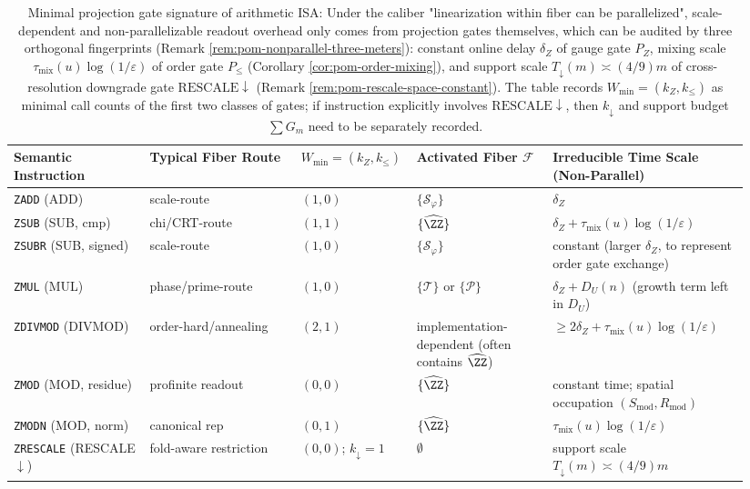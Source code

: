 \begin{table}[H]
\centering
\scriptsize
\setlength{\tabcolsep}{6pt}
\caption{Minimal projection gate signature of arithmetic ISA: Under the caliber "linearization within fiber can be parallelized", scale-dependent and non-parallelizable readout overhead only comes from projection gates themselves, which can be audited by three orthogonal fingerprints (Remark \ref{rem:pom-nonparallel-three-meters}): constant online delay \(\delta_Z\) of gauge gate \(P_Z\), mixing scale \(\tau_{\mathrm{mix}}(u)\log(1/\varepsilon)\) of order gate \(P_{\le}\) (Corollary \ref{cor:pom-order-mixing}), and support scale \(T_{\downarrow}(m)\asymp (4/9)m\) of cross-resolution downgrade gate \(\mathrm{RESCALE}\downarrow\) (Remark \ref{rem:pom-rescale-space-constant}). The table records \(W_{\min}=(k_Z,k_{\le})\) as minimal call counts of the first two classes of gates; if instruction explicitly involves \(\mathrm{RESCALE}\downarrow\), then \(k_{\downarrow}\) and support budget \(\sum G_m\) need to be separately recorded.}
\label{tab:pom-isa-minsig}
\begin{tabular}{p{0.18\linewidth} p{0.20\linewidth} p{0.12\linewidth} p{0.18\linewidth} p{0.26\linewidth}}
\toprule
Semantic Instruction & Typical Fiber Route & $W_{\min}=(k_Z,k_{\le})$ & Activated Fiber $\mathcal{F}$ & Irreducible Time Scale (Non-Parallel)\\
\midrule
\texttt{ZADD} (ADD) & scale-route & $(1,0)$ & $\{\mathcal{S}_\varphi\}$ & $\delta_Z$\\
\texttt{ZSUB} (SUB, cmp) & chi/CRT-route & $(1,1)$ & $\{\widehat{\ZZ}\}$ & $\delta_Z+\tau_{\mathrm{mix}}(u)\log(1/\varepsilon)$\\
\texttt{ZSUBR} (SUB, signed) & scale-route & $(1,0)$ & $\{\mathcal{S}_\varphi\}$ & constant (larger $\delta_Z$, to represent order gate exchange)\\
\texttt{ZMUL} (MUL) & phase/prime-route & $(1,0)$ & $\{\mathcal{T}\}$ or $\{\mathcal{P}\}$ & $\delta_Z + D_U(n)$ (growth term left in $D_U$)\\
\texttt{ZDIVMOD} (DIVMOD) & order-hard/annealing & $(2,1)$ & implementation-dependent (often contains $\widehat{\ZZ}$) & $\ge 2\delta_Z+\tau_{\mathrm{mix}}(u)\log(1/\varepsilon)$\\
\texttt{ZMOD} (MOD, residue) & profinite readout & $(0,0)$ & $\{\widehat{\ZZ}\}$ & constant time; spatial occupation $(S_{\mathrm{mod}},R_{\mathrm{mod}})$\\
\texttt{ZMODN} (MOD, norm) & canonical rep & $(0,1)$ & $\{\widehat{\ZZ}\}$ & $\tau_{\mathrm{mix}}(u)\log(1/\varepsilon)$\\
\texttt{ZRESCALE} (RESCALE$\downarrow$) & fold-aware restriction & $(0,0)$; $k_{\downarrow}=1$ & $\emptyset$ & support scale $T_{\downarrow}(m)\asymp (4/9)m$\\
\bottomrule
\end{tabular}
\end{table}

